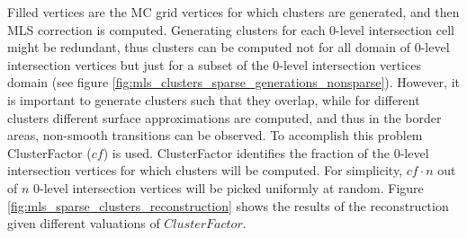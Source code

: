 Filled vertices are the MC grid vertices for which clusters are generated, and then MLS correction is computed. Generating clusters for each 0-level intersection cell might be redundant, thus clusters can be computed not for all domain of 0-level intersection vertices but just for a subset of the 0-level intersection vertices domain (see figure \ref{fig:mls_clusters_sparse_generations_nonsparse}). However, it is important to generate clusters such that they overlap, while for different clusters different surface approximations are computed, and thus in the border areas, non-smooth transitions can be observed. To accomplish this problem ClusterFactor ($cf$) is used. ClusterFactor identifies the fraction of the 0-level intersection vertices for which clusters will be computed. For simplicity, $cf \cdot n$ out of $n$ 0-level intersection vertices will be picked uniformly at random. Figure \ref{fig:mls_sparse_clusters_reconstruction} shows the results of the reconstruction given different valuations of $ClusterFactor$.
